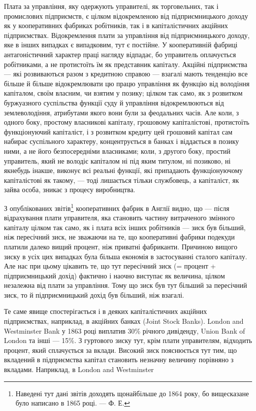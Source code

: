 Плата за управління, яку одержують управителі, як торговельних,
так і промислових підприємств, є цілком відокремленою від
підприємницького доходу як у кооперативних фабриках робітників,
так і в капіталістичних акційних підприємствах. Відокремлення
плати за управління від підприємницького доходу, яке в інших
випадках є випадковим, тут є постійне. У кооперативній фабриці
антагоністичний характер праці нагляду відпадає, бо управитель
оплачується робітниками, а не протистоїть їм як представник
капіталу. Акційні підприємства — які розвиваються разом
з кредитною справою — взагалі мають тенденцію все більше й
більше відокремлювати цю працю управління як функцію від
володіння капіталом, своїм власним, чи взятим у позику; цілком
так само, як з розвитком буржуазного суспільства функції суду
й управління відокремлюються від землеволодіння, атрибутами
якого вони були за феодальних часів. Але коли, з одного
боку, простому власникові капіталу, грошовому капіталістові,
протистоїть функціонуючий капіталіст, і з розвитком кредиту
цей грошовий капітал сам набирає суспільного характеру, концентрується
в банках і віддається в позику ними, а не його безпосередніми
власниками; коли, з другого боку, простий
управитель, який не володіє капіталом ні під яким титулом,
ні позиково, ні якнебудь інакше, виконує всі реальні функції,
які припадають функціонуючому капіталістові як такому, — тоді
лишається тільки службовець, а капіталіст, як зайва особа,
зникає з процесу виробництва.

З опублікованих звітів\footnote{
Наведені тут дані звітів доходять щонайбільше до 1864 року, бо вищесказане
було написано в 1865 році. — Ф. Е.
} кооперативних фабрик в Англії видно,
що — після відрахування плати управителя, яка становить частину
витраченого змінного капіталу цілком так само, як і плата
всіх інших робітників — зиск був більший, ніж пересічний зиск,
не зважаючи на те, що кооперативні фабрики подекуди платили
далеко вищий процент, ніж приватні фабриканти. Причиною
вищого зиску в усіх цих випадках була більша економія
в застосуванні сталого капіталу. Але нас при цьому цікавить те,
що тут пересічний зиск (= процент + підприємницький дохід)
фактично і наочно виступає як величина, цілком незалежна від
плати за управління. Тому що зиск був тут більший за пересічний
зиск, то й підприємницький дохід був більший, ніж взагалі.

Те саме явище спостерігається і в деяких капіталістичних акційних
підприємствах, наприклад, в акційних банках (Joint Stock
Banks). London and Westminster Bank у 1863 році виплатив 30\%
річного дивіденду, Union Bank of London та інші — 15\%. З гуртового
зиску тут, крім плати управителям, відходить процент,
який сплачується за вклади. Високий зиск пояснюється тут тим,
що вкладений в підприємства капітал становить незначну величину
порівняно з вкладами. Наприклад, в London and Westminster
\parbreak{}  %

